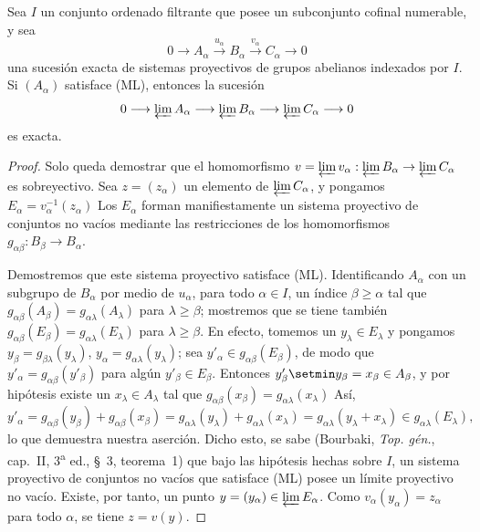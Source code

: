 \begin{proposition}[13.2.2]
\label{0.13.2.2}
\label{0.13.2.2-fr}
Sea $I$ un conjunto ordenado filtrante que posee un subconjunto
cofinal numerable, y sea
\[
0\longrightarrow A_\alpha\xrightarrow{u_\alpha}B_\alpha
\xrightarrow{v_\alpha}C_\alpha\longrightarrow0
\]
una sucesión exacta de sistemas proyectivos de grupos abelianos indexados
por $I$.
Si $(A_\alpha)$ satisface {\rm(ML)}, entonces la sucesión
\[
0\longrightarrow\varprojlim A_\alpha
\longrightarrow\varprojlim B_\alpha
\longrightarrow\varprojlim C_\alpha\longrightarrow0
\]
es exacta.
\end{proposition}

\begin{proof}
Solo queda demostrar que el homomorfismo
$v=\varprojlim v_\alpha:\varprojlim B_\alpha\to\varprojlim C_\alpha$ es sobreyectivo. Sea $z=(z_\alpha)$ un elemento de $\varprojlim C_\alpha$, y pongamos
$E_\alpha=v_\alpha^{-1}(z_\alpha)$
Los $E_\alpha$ forman manifiestamente un sistema proyectivo de conjuntos no
vacíos mediante las restricciones de los homomorfismos
$g_{\alpha\beta}:B_\beta\to B_\alpha$.

Demostremos que este sistema proyectivo satisface (ML).
Identificando $A_\alpha$ con un subgrupo de $B_\alpha$ por medio de
$u_\alpha$, para todo $\alpha\in I$, un índice
$\beta\geq\alpha$ tal que $g_{\alpha\beta}(A_\beta)=g_{\alpha\lambda}(A_\lambda)$ para $\lambda\geq\beta$; mostremos que se tiene también $g_{\alpha\beta}(E_\beta)=g_{\alpha\lambda}(E_\lambda)$ para $\lambda\geq\beta$. En efecto, tomemos un $y_\lambda\in E_\lambda$ y pongamos $y_\beta=g_{\beta\lambda}(y_\lambda)$, $y_\alpha=g_{\alpha\lambda}(y_\lambda)$; sea $y'_\alpha\in g_{\alpha\beta}(E_\beta)$, de modo que
$y'_\alpha=g_{\alpha\beta}(y'_\beta)$ para algún
$y'_\beta\in E_\beta$.
Entonces $y'_\beta\setmin y_\beta=x_\beta\in A_\beta$, y por hipótesis existe
un $x_\lambda\in A_\lambda$ tal que
$g_{\alpha\beta}(x_\beta)=g_{\alpha\lambda}(x_\lambda)$
Así,
\[
y'_\alpha=g_{\alpha\beta}(y_\beta)+g_{\alpha\beta}(x_\beta)
=g_{\alpha\lambda}(y_\lambda)+g_{\alpha\lambda}(x_\lambda)
=g_{\alpha\lambda}(y_\lambda+x_\lambda)
\in g_{\alpha\lambda}(E_\lambda),
\] lo que demuestra nuestra aserción. Dicho esto, se sabe (Bourbaki, \emph{Top. gén.}, cap.~II, 3\textsuperscript{a} ed., §~3, teorema~1) que bajo las hipótesis hechas sobre $I$, un sistema proyectivo de conjuntos no vacíos que satisface (ML)
posee un límite proyectivo no vacío.
Existe, por tanto, un punto
$y=(y_\alpha)\in\varprojlim E_\alpha$.
Como $v_\alpha(y_\alpha)=z_\alpha$ para todo $\alpha$, se tiene
$z=v(y)$.
\end{proof}

